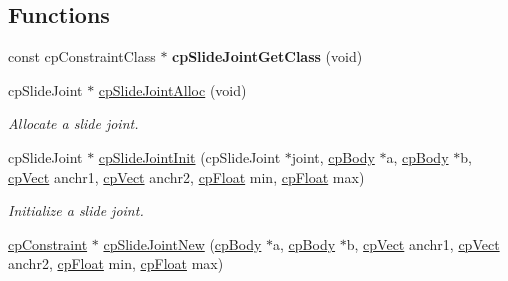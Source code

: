 \subsection*{Functions}
\begin{DoxyCompactItemize}
\item 
\hypertarget{group__cp_slide_joint_ga97803192c86266c6c73fb80d13a5fe8e}{const cp\-Constraint\-Class $\ast$ {\bfseries cp\-Slide\-Joint\-Get\-Class} (void)}\label{group__cp_slide_joint_ga97803192c86266c6c73fb80d13a5fe8e}

\item 
\hypertarget{group__cp_slide_joint_ga57404455797d03603bf166f7ac1733b3}{cp\-Slide\-Joint $\ast$ \hyperlink{group__cp_slide_joint_ga57404455797d03603bf166f7ac1733b3}{cp\-Slide\-Joint\-Alloc} (void)}\label{group__cp_slide_joint_ga57404455797d03603bf166f7ac1733b3}

\begin{DoxyCompactList}\small\item\em Allocate a slide joint. \end{DoxyCompactList}\item 
\hypertarget{group__cp_slide_joint_ga81bbc2ad25d62519d90faaeea717794a}{cp\-Slide\-Joint $\ast$ \hyperlink{group__cp_slide_joint_ga81bbc2ad25d62519d90faaeea717794a}{cp\-Slide\-Joint\-Init} (cp\-Slide\-Joint $\ast$joint, \hyperlink{structcp_body}{cp\-Body} $\ast$a, \hyperlink{structcp_body}{cp\-Body} $\ast$b, \hyperlink{structcp_vect}{cp\-Vect} anchr1, \hyperlink{structcp_vect}{cp\-Vect} anchr2, \hyperlink{group__basic_types_gac1ed65573e035bf892505768c852d8d3}{cp\-Float} min, \hyperlink{group__basic_types_gac1ed65573e035bf892505768c852d8d3}{cp\-Float} max)}\label{group__cp_slide_joint_ga81bbc2ad25d62519d90faaeea717794a}

\begin{DoxyCompactList}\small\item\em Initialize a slide joint. \end{DoxyCompactList}\item 
\hypertarget{group__cp_slide_joint_ga9f462bb5e5dac55d3cc37977cdc30fc5}{\hyperlink{structcp_constraint}{cp\-Constraint} $\ast$ \hyperlink{group__cp_slide_joint_ga9f462bb5e5dac55d3cc37977cdc30fc5}{cp\-Slide\-Joint\-New} (\hyperlink{structcp_body}{cp\-Body} $\ast$a, \hyperlink{structcp_body}{cp\-Body} $\ast$b, \hyperlink{structcp_vect}{cp\-Vect} anchr1, \hyperlink{structcp_vect}{cp\-Vect} anchr2, \hyperlink{group__basic_types_gac1ed65573e035bf892505768c852d8d3}{cp\-Float} min, \hyperlink{group__basic_types_gac1ed65573e035bf892505768c852d8d3}{cp\-Float} max)}\label{group__cp_slide_joint_ga9f462bb5e5dac55d3cc37977cdc30fc5}


\end{DoxyCompactItemize}
